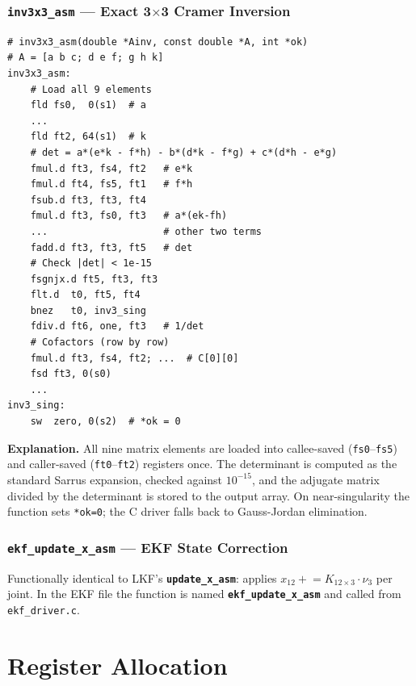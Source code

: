 \documentclass[12pt,a4paper]{article}
\newcommand{\reg}[1]{\texttt{\color{reg}#1}}
\newcommand{\func}[1]{\texttt{\bfseries #1}}
\begin{document}
\subsubsection{\func{inv3x3\_asm} --- Exact 3$\times$3 Cramer Inversion}

\begin{lstlisting}[caption={\func{inv3x3\_asm}: Cramer-rule 3x3 matrix inverse},label=lst:inv3x3]
# inv3x3_asm(double *Ainv, const double *A, int *ok)
# A = [a b c; d e f; g h k]
inv3x3_asm:
    # Load all 9 elements
    fld fs0,  0(s1)  # a
    ...
    fld ft2, 64(s1)  # k
    # det = a*(e*k - f*h) - b*(d*k - f*g) + c*(d*h - e*g)
    fmul.d ft3, fs4, ft2   # e*k
    fmul.d ft4, fs5, ft1   # f*h
    fsub.d ft3, ft3, ft4
    fmul.d ft3, fs0, ft3   # a*(ek-fh)
    ...                    # other two terms
    fadd.d ft3, ft3, ft5   # det
    # Check |det| < 1e-15
    fsgnjx.d ft5, ft3, ft3
    flt.d  t0, ft5, ft4
    bnez   t0, inv3_sing
    fdiv.d ft6, one, ft3   # 1/det
    # Cofactors (row by row)
    fmul.d ft3, fs4, ft2; ...  # C[0][0]
    fsd ft3, 0(s0)
    ...
inv3_sing:
    sw  zero, 0(s2)  # *ok = 0
\end{lstlisting}

\textbf{Explanation.}
All nine matrix elements are loaded into callee-saved
(\reg{fs0}--\reg{fs5}) and caller-saved (\reg{ft0}--\reg{ft2})
registers once. The determinant is computed as the standard Sarrus
expansion, checked against $10^{-15}$, and the adjugate matrix
divided by the determinant is stored to the output array.
On near-singularity the function sets \texttt{*ok=0}; the C driver
falls back to Gauss-Jordan elimination.

\subsubsection{\func{ekf\_update\_x\_asm} --- EKF State Correction}

Functionally identical to LKF's \func{update\_x\_asm}: applies
$x_{12} \mathrel{+}= K_{12\times3} \cdot \nu_3$ per joint. In the
EKF file the function is named \func{ekf\_update\_x\_asm} and called
from \texttt{ekf\_driver.c}.

\section{Register Allocation}
\label{sec:registers}
\end{document}
